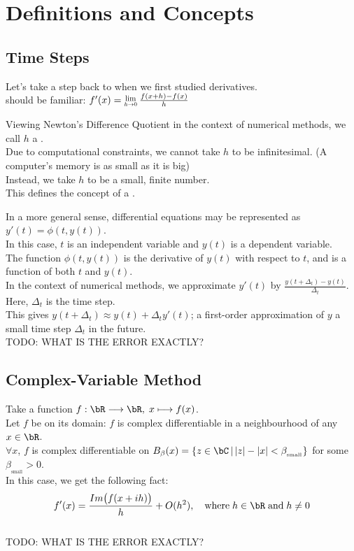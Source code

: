 \section{Definitions and Concepts}

\subsection{Time Steps}
Let's take a step back to when we first studied derivatives.\\
 should be familiar: 
$f'(x) = \Lim{h \to 0} \frac{f(x+h) - f(x)}{h}$

\par Viewing Newton's Difference Quotient in the context of numerical methods, we call $h$ a .\\
Due to computational constraints, we cannot take $h$ to be infinitesimal. (A computer's memory is as small as it is big)\\
Instead, we take $h$ to be a small, finite number.\\
This defines the concept of a .\\

\par In a more general sense, differential equations may be represented as $y'(t) = \phi(t, y(t))$.\\
In this case, $t$ is an independent variable and $y(t)$ is a dependent variable.\\
The function $\phi(t, y(t))$ is the derivative of $y(t)$ with respect to $t$, and is a function of both $t$ and $y(t)$.\\
In the context of numerical methods, we approximate $y'(t)$ by $\frac{y(t+\Delta_t) - y(t)}{\Delta_t}$.\\
Here, $\Delta_t$ is the time step.\\
This gives $y(t + \Delta_t) \approx y(t) + \Delta_t y'(t)$; a first-order approximation of $y$ a small time step $\Delta_t$ in the future.\\
TODO: WHAT IS THE ERROR EXACTLY?

\subsection{Complex-Variable Method}
Take a function $f: \bR \longrightarrow \bR,\; x \longmapsto f(x)$.\\
Let $f$ be  on its domain: $f$ is complex differentiable in a neighbourhood of any $x \in \bR$.\\
$\forall x$, $f$ is complex differentiable on $B_{\beta}(x) = \{z \in \bC \,|\, |z|-|x| < \beta_{_{\text{small}}}\}$ for some $\beta_{_{\text{small}}} > 0$.\\
In this case, we get the following fact:\\
\[f'(x) = \frac{Im\big(f(x+ih)\big)}{h} + O(h^2), \quad \text{where}\; h \in \bR \;\text{and}\; h \neq 0\]\\
TODO: WHAT IS THE ERROR EXACTLY?

